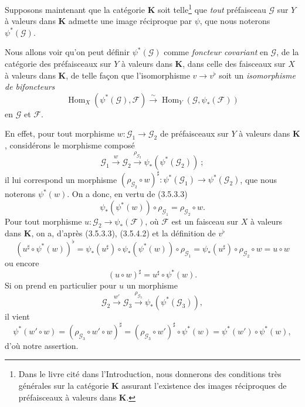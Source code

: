 
\begin{env}[3.5.4]
\label{0.3.5.4-fr}
Supposons maintenant que la catégorie $\boldsymbol{K}$ soit telle\footnote{Dans
le livre cité dans l'Introduction, nous donnerons des conditions très
générales sur la catégorie $\boldsymbol{K}$ assurant l'existence des images
réciproques de préfaisceaux à valeurs dans $\boldsymbol{K}$.} que \emph{tout}
préfaisceau $\mathcal{G}$ sur $Y$ à valeurs dans $\boldsymbol{K}$ admette une
image réciproque par $\psi$, que nous noterons $\psi^*(\mathcal{G})$.

Nous allons voir qu'on peut définir $\psi^*(\mathcal{G})$ comme \emph{foncteur
covariant} en $\mathcal{G}$, de la catégorie des préfaisceaux sur $Y$ à
valeurs dans $\boldsymbol{K}$, dans celle des faisceaux sur $X$ à valeurs dans
$\boldsymbol{K}$, de telle façon que l'isomorphisme $v\to v^\flat$ soit un
\emph{isomorphisme de bifoncteurs}
\begin{equation*}
  \operatorname{Hom}_X(\psi^*(\mathcal{G}),\mathcal{F})
  \xrightarrow{\sim}
  \operatorname{Hom}_Y(\mathcal{G},\psi_*(\mathcal{F}))
\tag{3.5.4.1}\label{0.3.5.4.1-fr}
\end{equation*}
en $\mathcal{G}$ et $\mathcal{F}$.

En effet, pour tout morphisme
$w:\mathcal{G}_1\to\mathcal{G}_2$ de préfaisceaux sur $Y$ à valeurs dans
$\boldsymbol{K}$, considérons le morphisme composé
\[
  \mathcal{G}_1\xrightarrow{w}\mathcal{G}_2
  \xrightarrow{\rho_{\mathcal{G}_2}}
  \psi_*(\psi^*(\mathcal{G}_2))~;
\]
il lui correspond un morphisme
$(\rho_{\mathcal{G}_2}\circ w)^\sharp:
\psi^*(\mathcal{G}_1)\to\psi^*(\mathcal{G}_2)$, que nous noterons
$\psi^*(w)$. On a donc, en vertu de (3.5.3.3)
\begin{equation*}
  \psi_*(\psi^*(w))\circ\rho_{\mathcal{G}_1}
  =\rho_{\mathcal{G}_2}\circ w.
\tag{3.5.4.2}\label{0.3.5.4.2-fr}
\end{equation*}
Pour tout morphisme $u:\mathcal{G}_2\to\psi_*(\mathcal{F})$, où
$\mathcal{F}$ est un faisceau sur $X$ à valeurs dans $\boldsymbol{K}$, on a,
d'après (3.5.3.3), (3.5.4.2) et la définition de $v^\flat$
\[
  (u^\sharp\circ\psi^*(w))^\flat
  =\psi_*(u^\sharp)\circ\psi_*(\psi^*(w))\circ\rho_{\mathcal{G}_1}
  =\psi_*(u^\sharp)\circ\rho_{\mathcal{G}_2}\circ w
  =u\circ w
\]
ou encore
\begin{equation*}
  (u\circ w)^\sharp=u^\sharp\circ\psi^*(w).
\tag{3.5.4.3}\label{0.3.5.4.3-fr}
\end{equation*}
Si on prend en particulier pour $u$ un morphisme
\[
  \mathcal{G}_2\xrightarrow{w'}\mathcal{G}_3
  \xrightarrow{\rho_{\mathcal{G}_3}}
  \psi_*(\psi^*(\mathcal{G}_3)),
\]
il vient
\[
  \psi^*(w'\circ w)
  =(\rho_{\mathcal{G}_3}\circ w'\circ w)^\sharp
  =(\rho_{\mathcal{G}_3}\circ w')^\sharp\circ\psi^*(w)
  =\psi^*(w')\circ\psi^*(w),
\]
d'où notre assertion.


\end{env}
